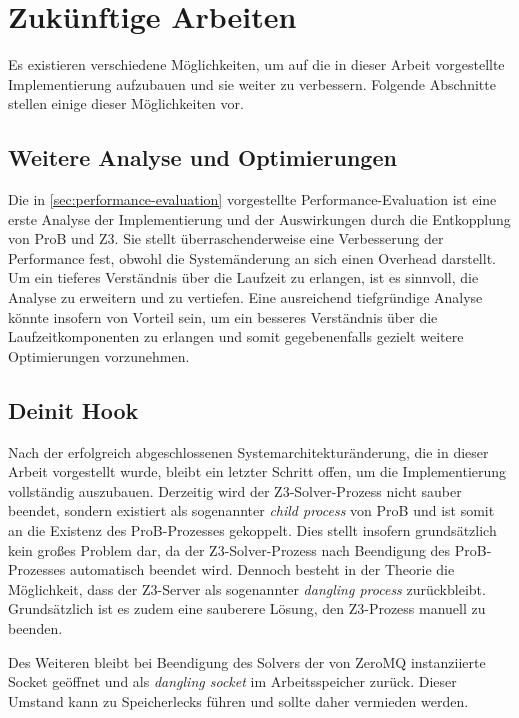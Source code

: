 

\section{Zukünftige Arbeiten}

Es existieren verschiedene Möglichkeiten, um auf die in dieser Arbeit vorgestellte Implementierung aufzubauen und sie weiter zu verbessern.
Folgende Abschnitte stellen einige dieser Möglichkeiten vor.

\subsection{Weitere Analyse und Optimierungen}

Die in \cref{sec:performance-evaluation} vorgestellte Performance-Evaluation ist eine erste Analyse der Implementierung und der Auswirkungen durch die Entkopplung von ProB und Z3.
Sie stellt überraschenderweise eine Verbesserung der Performance fest, obwohl die Systemänderung an sich einen Overhead darstellt.
Um ein tieferes Verständnis über die Laufzeit zu erlangen, ist es sinnvoll, die Analyse zu erweitern und zu vertiefen.
Eine ausreichend tiefgründige Analyse könnte insofern von Vorteil sein, um ein besseres Verständnis über die Laufzeitkomponenten zu erlangen und somit gegebenenfalls gezielt weitere Optimierungen vorzunehmen.

\subsection{Deinit Hook}

Nach der erfolgreich abgeschlossenen Systemarchitekturänderung, die in dieser Arbeit vorgestellt wurde,
bleibt ein letzter Schritt offen, um die Implementierung vollständig auszubauen.
Derzeitig wird der Z3-Solver-Prozess nicht sauber beendet, sondern existiert als sogenannter \textit{child process} von ProB und ist somit an die Existenz des ProB-Prozesses gekoppelt.
Dies stellt insofern grundsätzlich kein großes Problem dar, da der Z3-Solver-Prozess nach Beendigung des ProB-Prozesses automatisch beendet wird.
Dennoch besteht in der Theorie die Möglichkeit, dass der Z3-Server als sogenannter \textit{dangling process} zurückbleibt.
Grundsätzlich ist es zudem eine sauberere Lösung, den Z3-Prozess manuell zu beenden.

Des Weiteren bleibt bei Beendigung des Solvers der von ZeroMQ instanziierte Socket geöffnet und als \textit{dangling socket} im Arbeitsspeicher zurück.
Dieser Umstand kann zu Speicherlecks führen und sollte daher vermieden werden.

